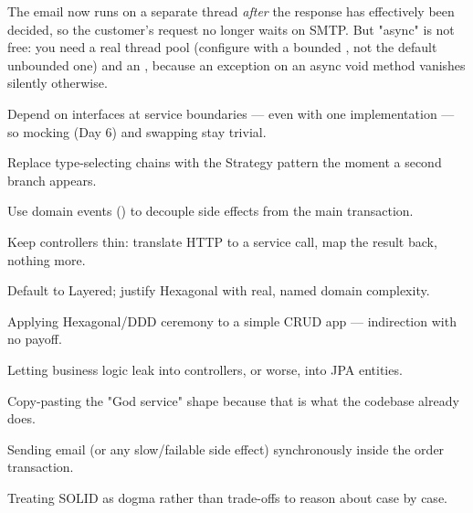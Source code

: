 \begin{perfnote}
The email now runs on a separate thread \emph{after} the response has effectively been decided, so the customer's request no longer waits on SMTP. But "async" is not free: you need a real thread pool (configure  with a bounded , not the default unbounded one) and an , because an exception on an async void method vanishes silently otherwise.
\end{perfnote}

\begin{bestpractices}
\begin{wbitem}
  \item Depend on interfaces at service boundaries --- even with one implementation --- so mocking (Day 6) and swapping stay trivial.
  \item Replace type-selecting  chains with the Strategy pattern the moment a second branch appears.
  \item Use domain events () to decouple side effects from the main transaction.
  \item Keep controllers thin: translate HTTP to a service call, map the result back, nothing more.
  \item Default to Layered; justify Hexagonal with real, named domain complexity.
\end{wbitem}
\end{bestpractices}
\begin{mistakes}
\begin{wbitem}
  \item Applying Hexagonal/DDD ceremony to a simple CRUD app --- indirection with no payoff.
  \item Letting business logic leak into controllers, or worse, into JPA entities.
  \item Copy-pasting the "God service" shape because that is what the codebase already does.
  \item Sending email (or any slow/failable side effect) synchronously inside the order transaction.
  \item Treating SOLID as dogma rather than trade-offs to reason about case by case.
\end{wbitem}
\end{mistakes}


